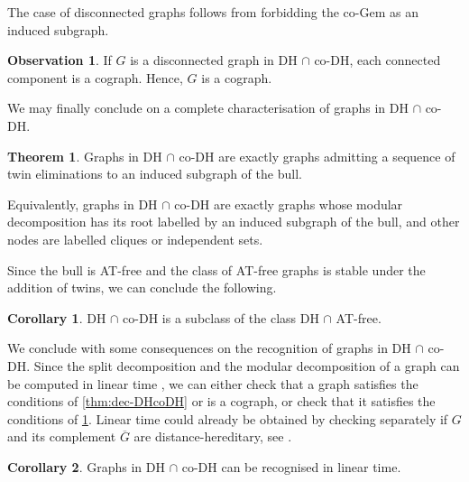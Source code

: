 \documentclass{amsart}
\def\DHcoDH{DH $\cap$ co-DH}
\theoremstyle{definition}
\newtheorem{theorem}{Theorem}
\newtheorem{observation}{Observation}
\newtheorem{corollary}{Corollary}
\begin{document}
The case of disconnected graphs follows from forbidding the co-Gem as an induced subgraph.

\begin{observation}
	If $G$ is a disconnected graph in \DHcoDH{}, each connected component is a
	cograph. Hence, $G$ is a cograph.
\end{observation}

We may finally conclude on a complete characterisation of graphs in \DHcoDH{}.

\begin{theorem}\label{thm:modular-DHcoDH}
	Graphs in \DHcoDH{} are exactly graphs admitting a sequence of twin eliminations to an
	induced subgraph of the bull.

	Equivalently, graphs in \DHcoDH{} are exactly graphs whose modular
	decomposition has its root labelled by an induced subgraph of the bull,
	and other nodes are labelled cliques or independent sets.
\end{theorem}

Since the bull is AT-free and the class of AT-free graphs is stable under the
addition of twins, we can conclude the following.

\begin{corollary}
	\DHcoDH{} is a subclass of the class DH $\cap$ AT-free.
\end{corollary}

We conclude with some consequences on the recognition of graphs in \DHcoDH{}.
Since the split decomposition and the modular decomposition of a graph can be
computed in linear time \cite{SplitAlgo,McConnellS99,CournierH94}, we can either check that
a graph satisfies the conditions of \cref{thm:dec-DHcoDH} or is a cograph, or
check that it satisfies the conditions of \cref{thm:modular-DHcoDH}. Linear
time could already be obtained by checking separately if $G$ and its complement
$\overline{G}$ are distance-hereditary, see \cite{DuboisGM08}.

\begin{corollary}
	Graphs in \DHcoDH{} can be recognised in linear time.
\end{corollary}



\end{document}
